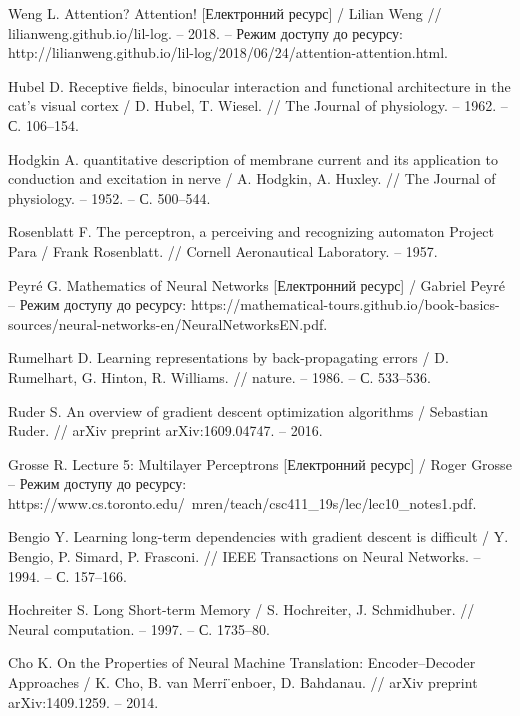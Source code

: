 \renewcommand\bibname{ПЕРЕЛІК ДЖЕРЕЛ ПОСИЛАННЯ}
\begin{thebibliography}{9}
    Weng L. Attention? Attention! [Електронний ресурс] / Lilian Weng // lilianweng.github.io/lil-log. – 2018. – Режим доступу до ресурсу: http://lilianweng.github.io/lil-log/2018/06/24/attention-attention.html.

    Hubel D. Receptive fields, binocular interaction and functional architecture in the cat’s visual cortex / D. Hubel, T. Wiesel. // The Journal of physiology. – 1962. – С. 106–154.

    Hodgkin A. quantitative description of membrane current and its application to conduction and excitation in nerve / A. Hodgkin, A. Huxley. // The Journal of physiology. – 1952. – С. 500–544.

    Rosenblatt F. The perceptron, a perceiving and recognizing automaton Project Para / Frank Rosenblatt. // Cornell Aeronautical Laboratory. – 1957.

    Peyré G. Mathematics of Neural Networks [Електронний ресурс] / Gabriel Peyré – Режим доступу до ресурсу: https://mathematical-tours.github.io/book-basics-sources/neural-networks-en/NeuralNetworksEN.pdf.

    Rumelhart D. Learning representations by back-propagating errors / D. Rumelhart, G. Hinton, R. Williams. // nature. – 1986. – С. 533–536.

    Ruder S. An overview of gradient descent optimization algorithms / Sebastian Ruder. // arXiv preprint arXiv:1609.04747. – 2016.

    Grosse R. Lecture 5: Multilayer Perceptrons [Електронний ресурс] / Roger Grosse – Режим доступу до ресурсу: https://www.cs.toronto.edu/~mren/teach/csc411\_19s/lec/lec10\_notes1.pdf.

    Bengio Y. Learning long-term dependencies with gradient descent is difficult / Y. Bengio, P. Simard, P. Frasconi. // IEEE Transactions on Neural Networks. – 1994. – С. 157–166.
    
    Hochreiter S. Long Short-term Memory / S. Hochreiter, J. Schmidhuber. // Neural computation. – 1997. – С. 1735–80.

    Cho K. On the Properties of Neural Machine Translation: Encoder–Decoder Approaches / K. Cho, B. van Merri ̈enboer, D. Bahdanau. // arXiv preprint arXiv:1409.1259. – 2014.


\end{thebibliography}
